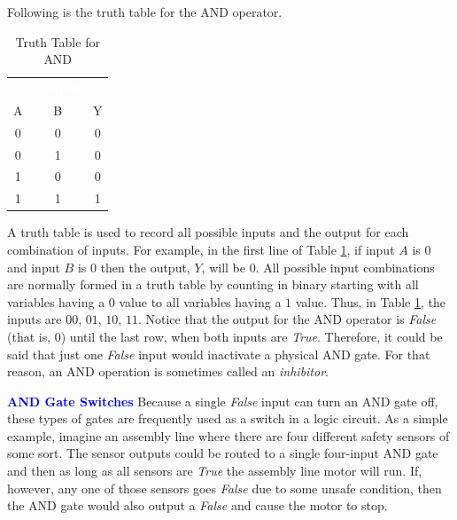 Following is the truth table for the \textsf{AND}  operator.

\begin{table}[H]
  \sffamily
  \newcommand{\head}[1]{\textcolor{white}{\textbf{#1}}}    
  \begin{center}
    \begin{tabular}{ccc} 
      \rowcolor{black!75}
      \multicolumn{2}{c}{\head{Inputs}} & \head{Output} \\
      A & B & Y \\
      \hline
      0 & 0 & 0 \\
      0 & 1 & 0 \\
      1 & 0 & 0 \\
      1 & 1 & 1 
    \end{tabular}
  \end{center}
  \caption{Truth Table for AND}
  \label{04tt01}
\end{table}

A truth table is used to record all possible inputs and the output for each combination of inputs. For example, in the first line of Table \ref{04tt01}, if input $ A $ is $ 0 $ and input $ B $ is $ 0 $ then the output, $ Y $, will be $ 0 $. All possible input combinations are normally formed in a truth table by counting in binary starting with all variables having a $ 0 $ value to all variables having a $ 1 $ value. Thus, in Table \ref{04tt01}, the inputs are $ 00 $, $ 01$, $ 10$, $ 11 $. Notice that the output for the \textsf{AND}  operator is \emph{False} (that is, $ 0 $) until the last row, when both inputs are \emph{True}. Therefore, it could be said that just one \emph{False} input would inactivate a physical \textsf{AND}  gate. For that reason, an \textsf{AND}  operation is sometimes called an \emph{inhibitor}.

\begin{tcolorbox}[colback=blue!5!white,colframe=blue!75!black]
  \textcolor{blue}{\textbf{AND Gate Switches}}
  \tcblower
  Because a single \emph{False} input can turn an \textsf{AND} gate off, these types of gates are frequently used as a switch in a logic circuit. As a simple example, imagine an assembly line where there are four different safety sensors of some sort. The sensor outputs could be routed to a single four-input \textsf{AND}  gate and then as long as all sensors are \emph{True} the assembly line motor will run. If, however, any one of those sensors goes \emph{False} due to some unsafe condition, then the \textsf{AND}  gate would also output a \emph{False} and cause the motor to stop.
\end{tcolorbox}

